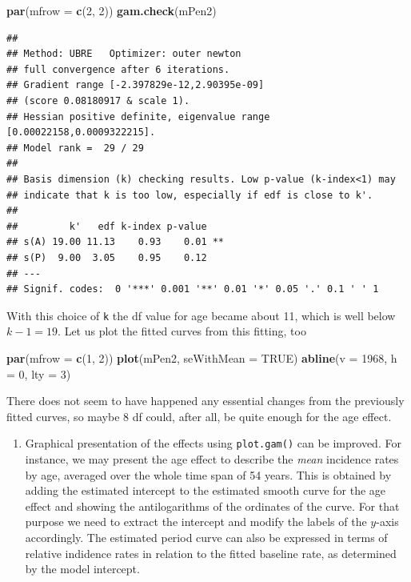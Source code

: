 \documentclass[
]{book}
\newenvironment{Shaded}{\begin{snugshade}}{\end{snugshade}}
\newcommand{\AttributeTok}[1]{\textcolor[rgb]{0.13,0.29,0.53}{#1}}
\newcommand{\ConstantTok}[1]{\textcolor[rgb]{0.56,0.35,0.01}{#1}}
\newcommand{\DecValTok}[1]{\textcolor[rgb]{0.00,0.00,0.81}{#1}}
\newcommand{\FunctionTok}[1]{\textcolor[rgb]{0.13,0.29,0.53}{\textbf{#1}}}
\newcommand{\NormalTok}[1]{#1}
\providecommand{\tightlist}{%
  \setlength{\itemsep}{0pt}\setlength{\parskip}{0pt}}
\begin{document}
\begin{Shaded}
\begin{Highlighting}[]
\FunctionTok{par}\NormalTok{(}\AttributeTok{mfrow =} \FunctionTok{c}\NormalTok{(}\DecValTok{2}\NormalTok{, }\DecValTok{2}\NormalTok{))}
\FunctionTok{gam.check}\NormalTok{(mPen2)}
\end{Highlighting}
\end{Shaded}

\begin{verbatim}
## 
## Method: UBRE   Optimizer: outer newton
## full convergence after 6 iterations.
## Gradient range [-2.397829e-12,2.90395e-09]
## (score 0.08180917 & scale 1).
## Hessian positive definite, eigenvalue range [0.00022158,0.0009322215].
## Model rank =  29 / 29 
## 
## Basis dimension (k) checking results. Low p-value (k-index<1) may
## indicate that k is too low, especially if edf is close to k'.
## 
##         k'   edf k-index p-value   
## s(A) 19.00 11.13    0.93    0.01 **
## s(P)  9.00  3.05    0.95    0.12   
## ---
## Signif. codes:  0 '***' 0.001 '**' 0.01 '*' 0.05 '.' 0.1 ' ' 1
\end{verbatim}

With this choice of \texttt{k} the df value for age became about 11,
which is well below \(k-1 = 19\). Let us plot the fitted curves from
this fitting, too

\begin{Shaded}
\begin{Highlighting}[]
\FunctionTok{par}\NormalTok{(}\AttributeTok{mfrow =} \FunctionTok{c}\NormalTok{(}\DecValTok{1}\NormalTok{, }\DecValTok{2}\NormalTok{))}
\FunctionTok{plot}\NormalTok{(mPen2, }\AttributeTok{seWithMean =} \ConstantTok{TRUE}\NormalTok{)}
\FunctionTok{abline}\NormalTok{(}\AttributeTok{v =} \DecValTok{1968}\NormalTok{, }\AttributeTok{h =} \DecValTok{0}\NormalTok{, }\AttributeTok{lty =} \DecValTok{3}\NormalTok{)}
\end{Highlighting}
\end{Shaded}

There does not seem to have happened any essential changes from the
previously fitted curves, so maybe 8 df could, after all, be quite
enough for the age effect.

\begin{enumerate}
\def\labelenumi{\arabic{enumi}.}
\setcounter{enumi}{4}
\tightlist
\item
  Graphical presentation of the effects using \texttt{plot.gam()}
  can be improved. For instance, we may present the
  age effect to describe the \emph{mean} incidence rates by age, averaged
  over the whole time span of 54 years. This is obtained by adding
  the estimated intercept
  to the estimated smooth curve for the age effect and showing
  the antilogarithms of the ordinates of the curve.
  For that purpose we need to extract the intercept and modify the
  labels of the \(y\)-axis accordingly. The estimated period curve
  can also be expressed in terms of
  relative indidence rates in relation to the fitted baseline rate,
  as determined by the model intercept.
\end{enumerate}
\end{document}
